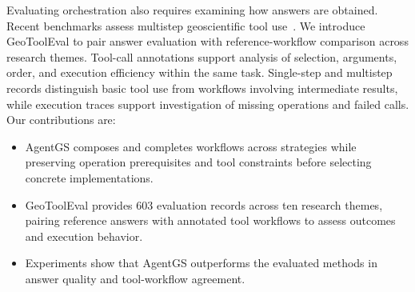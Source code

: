 Evaluating orchestration also requires examining how answers are obtained. Recent benchmarks assess multistep geoscientific tool use~\cite{krechetova2025geobenchx,feng2026earthagent,yu2026geoagentbench}. We introduce GeoToolEval to pair answer evaluation with reference-workflow comparison across research themes. Tool-call annotations support analysis of selection, arguments, order, and execution efficiency within the same task. Single-step and multistep records distinguish basic tool use from workflows involving intermediate results, while execution traces support investigation of missing operations and failed calls. Our contributions are:

\begin{itemize}
\item AgentGS composes and completes workflows across strategies while preserving operation prerequisites and tool constraints before selecting concrete implementations.
\item GeoToolEval provides 603 evaluation records across ten research themes, pairing reference answers with annotated tool workflows to assess outcomes and execution behavior.
\item Experiments show that AgentGS outperforms the evaluated methods in answer quality and tool-workflow agreement.
\end{itemize}
